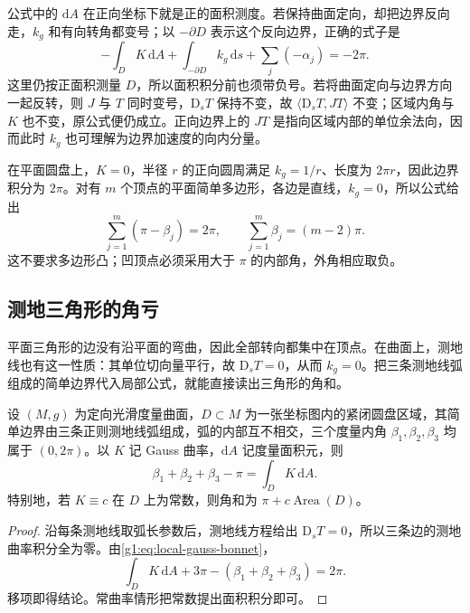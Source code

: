 \ProseParagraphBreak

公式中的 \(\mathrm{d}A\) 在正向坐标下就是正的面积测度。若保持曲面定向，却把边界反向走，\(k_g\) 和有向转角都变号；以 \(-\partial D\) 表示这个反向边界，正确的式子是
\[
	-\int_D K\,\mathrm{d}A+\int_{-\partial D}k_g\,\mathrm{d}s+\sum_j(-\alpha_j)=-2\pi.
\]
这里仍按正面积测量 \(D\)，所以面积积分前也须带负号。若将曲面定向与边界方向一起反转，则 \(J\) 与 \(T\) 同时变号，\(\mathrm{D}_sT\) 保持不变，故 \(\langle \mathrm{D}_sT,JT\rangle\) 不变；区域内角与 \(K\) 也不变，原公式便仍成立。正向边界上的 \(JT\) 是指向区域内部的单位余法向，因而此时 \(k_g\) 也可理解为边界加速度的向内分量。

\begin{example}
	\label{g1:exm:planar-gauss-bonnet}
	在平面圆盘上，\(K=0\)，半径 \(r\) 的正向圆周满足 \(k_g=1/r\)、长度为 \(2\pi r\)，因此边界积分为 \(2\pi\)。对有 \(m\) 个顶点的平面简单多边形，各边是直线，\(k_g=0\)，所以公式给出
	\[
		\sum_{j=1}^m(\pi-\beta_j)=2\pi,
		\qquad \sum_{j=1}^m\beta_j=(m-2)\pi.
	\]
	这不要求多边形凸；凹顶点必须采用大于 \(\pi\) 的内部角，外角相应取负。
\end{example}

\subsection{测地三角形的角亏}
\label{g1:subsec:0903:04}

平面三角形的边没有沿平面的弯曲，因此全部转向都集中在顶点。在曲面上，测地线也有这一性质：其单位切向量平行，故 \(\mathrm{D}_sT=0\)，从而 \(k_g=0\)。把三条测地线弧组成的简单边界代入局部公式，就能直接读出三角形的角和。

\begin{corollary}
	\label{g1:cor:geodesic-triangle-defect}
	设 \((M,g)\) 为定向光滑度量曲面，\(D\subset M\) 为一张坐标图内的紧闭圆盘区域，其简单边界由三条正则测地线弧组成，弧的内部互不相交，三个度量内角 \(\beta_1,\beta_2,\beta_3\) 均属于 \((0,2\pi)\)。以 \(K\) 记 Gauss 曲率，\(\mathrm dA\) 记度量面积元，则
	\begin{equation}
		\label{g1:eq:geodesic-triangle-defect}
		\beta_1+\beta_2+\beta_3-\pi=\int_D K\,\mathrm{d}A.
	\end{equation}
	特别地，若 \(K\equiv c\) 在 \(D\) 上为常数，则角和为 \(\pi+c\operatorname{Area}(D)\)。
\end{corollary}
\begin{proof}
	沿每条测地线取弧长参数后，测地线方程给出 \(\mathrm{D}_sT=0\)，所以三条边的测地曲率积分全为零。由\eqref{g1:eq:local-gauss-bonnet}，
	\[
		\int_D K\,\mathrm{d}A+3\pi-(\beta_1+\beta_2+\beta_3)=2\pi.
	\]
	移项即得结论。常曲率情形把常数提出面积积分即可。
\end{proof}

